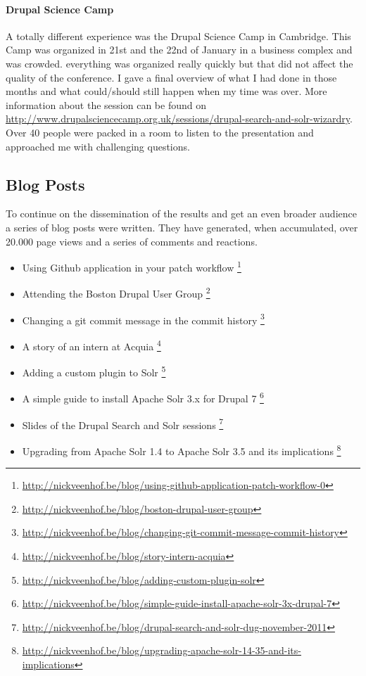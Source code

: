 \paragraph{Drupal Science Camp} A totally different experience was the Drupal Science Camp in Cambridge. This Camp was organized in 21st and the 22nd of January in a business complex and was crowded. everything was organized really quickly but that did not affect the quality of the conference. I gave a final overview of what I had done in those months and what could/should still happen when my time was over. More information about the session can be found on \url{http://www.drupalsciencecamp.org.uk/sessions/drupal-search-and-solr-wizardry}. Over 40 people were packed in a room to listen to the presentation and approached me with challenging questions. 

\subsection{Blog Posts}
To continue on the dissemination of the results and get an even broader audience a series of blog posts were written. They have generated, when accumulated, over 20.000 page views and a series of comments and reactions.

\begin{itemize}
\item Using Github application in your patch workflow \footnote{\url{http://nickveenhof.be/blog/using-github-application-patch-workflow-0}} 
\item Attending the Boston Drupal User Group \footnote{\url{http://nickveenhof.be/blog/boston-drupal-user-group}} 
\item Changing a git commit message in the commit history \footnote{\url{http://nickveenhof.be/blog/changing-git-commit-message-commit-history}} 
\item A story of an intern at Acquia \footnote{\url{http://nickveenhof.be/blog/story-intern-acquia}} 
\item Adding a custom plugin to Solr \footnote{\url{http://nickveenhof.be/blog/adding-custom-plugin-solr}} 
\item A simple guide to install Apache Solr 3.x for Drupal 7 \footnote{\url{http://nickveenhof.be/blog/simple-guide-install-apache-solr-3x-drupal-7}} 
\item Slides of the Drupal Search and Solr sessions \footnote{\url{http://nickveenhof.be/blog/drupal-search-and-solr-dug-november-2011}} 
\item Upgrading from Apache Solr 1.4 to Apache Solr 3.5 and its implications \footnote{\url{http://nickveenhof.be/blog/upgrading-apache-solr-14-35-and-its-implications}} 
\end{itemize}

